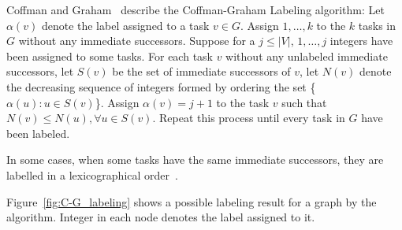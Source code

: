 \documentclass[letterpaper,12pt]{article}
\theoremstyle{definition}
\begin{document}
Coffman and Graham~\cite{coffman_optimal_1972} describe the Coffman-Graham Labeling algorithm: Let $\alpha(v)$ denote the label assigned to a task $v\in G$. Assign $1, \dots, k$ to the $k$ tasks in $G$ without any immediate successors. Suppose for a $ j\leq|V|$, $1,\dots, j$ integers have been assigned to some tasks. For each task $v$ without any unlabeled immediate successors, let $S(v)$ be the set of immediate successors of $v$, let $N(v)$ denote the decreasing sequence of integers formed by ordering the set \{$\alpha(u):u\in S(v)$\}.  Assign $\alpha(v) = j+1$ to the task $v$ such that $N(v)\leq N(u), \forall u \in S(v)$. Repeat this process until every task in $G$ have been labeled. 

In some cases, when some tasks have the same immediate successors, they are labelled in a lexicographical order~\cite{battista_chapter_1998}.

Figure~\ref{fig:C-G_labeling} shows a possible labeling result for a graph by the algorithm. Integer in each node denotes the label assigned to it. 
\end{document}
